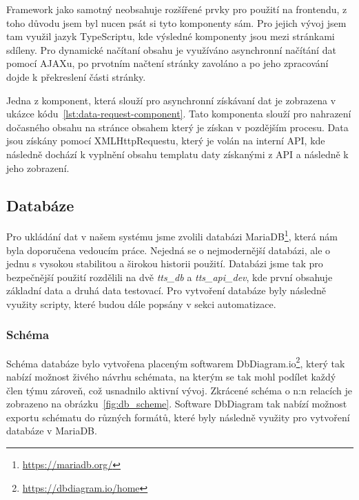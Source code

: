 Framework jako samotný neobsahuje rozšířené prvky pro použití na frontendu, z toho důvodu jsem byl nucen psát si tyto komponenty sám. Pro jejich vývoj jsem tam využil jazyk TypeScriptu, kde výsledné komponenty jsou mezi stránkami sdíleny. Pro dynamické načítaní obsahu je využíváno asynchronní načítání dat pomocí AJAXu, po prvotním načtení stránky zavoláno a po jeho zpracování dojde k překreslení části stránky.

Jedna z komponent, která slouží pro asynchronní získávaní dat je zobrazena v ukázce kódu~\ref{lst:data-request-component}. Tato komponenta slouží pro nahrazení dočasného obsahu na stránce obsahem který je získan v pozdějším procesu. Data jsou získány pomocí XMLHttpRequestu, který je volán na interní API, kde následně dochází k vyplnění obsahu templatu daty získanými z API a následně k jeho zobrazení.

\newpage


\newpage
\subsection{Databáze}
\label{subsec:implementation-technologies-database}
Pro ukládání dat v našem systému jsme zvolili databázi MariaDB\footnote{\href{https://mariadb.org/}{https://mariadb.org/}}, která nám byla doporučena vedoucím práce. Nejedná se o nejmodernější databázi, ale o jednu s vysokou stabilitou a širokou historii použití. Databázi jsme tak pro bezpečnější použití rozdělili na dvě \textit{tts\_db} a \textit{tts\_api\_dev}, kde první obsahuje základní data a druhá data testovací. Pro vytvoření databáze byly následně využity scripty, které budou dále popsány v sekci automatizace.

\subsubsection*{Schéma}
\label{subsubsec:implementation-technologies-database-scheme}
Schéma databáze bylo vytvořena placeným softwarem DbDiagram.io\footnote{\href{https://dbdiagram.io/home}{https://dbdiagram.io/home}}, který tak nabízí možnost živého návrhu schémata, na kterým se tak mohl podílet každý člen týmu zároveň, což usnadnilo aktivní vývoj. Zkrácené schéma o n:n relacích je zobrazeno na obrázku~\ref{fig:db_scheme}. Software DbDiagram tak nabízí možnost exportu schématu do různých formátů, které byly následně využity pro vytvoření databáze v MariaDB\@.

